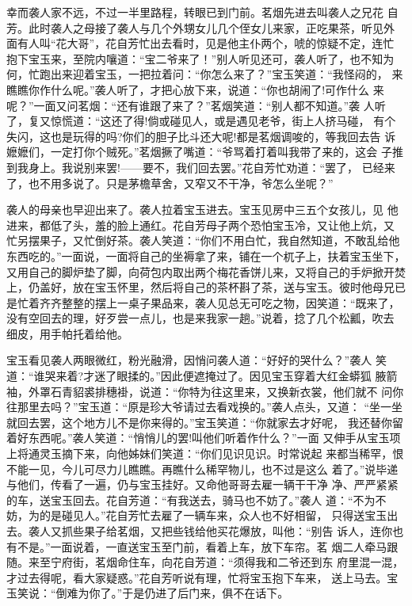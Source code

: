 幸而袭人家不远，不过一半里路程，转眼已到门前。茗烟先进去叫袭人之兄花
自芳。此时袭人之母接了袭人与几个外甥女儿几个侄女儿来家，正吃果茶，听见外
面有人叫“花大哥”，花自芳忙出去看时，见是他主仆两个，唬的惊疑不定，连忙
抱下宝玉来，至院内嚷道：“宝二爷来了！”别人听见还可，袭人听了，也不知为
何，忙跑出来迎着宝玉，一把拉着问：“你怎么来了？”宝玉笑道：“我怪闷的，
来瞧瞧你作什么呢。”袭人听了，才把心放下来，说道：“你也胡闹了!可作什么
来呢？”一面又问茗烟：“还有谁跟了来了？”茗烟笑道：“别人都不知道。”袭
人听了，复又惊慌道：“这还了得!倘或碰见人，或是遇见老爷，街上人挤马碰，
有个失闪，这也是玩得的吗?你们的胆子比斗还大呢!都是茗烟调唆的，等我回去告
诉嬷嬷们，一定打你个贼死。”茗烟撅了嘴道：“爷骂着打着叫我带了来的，这会
子推到我身上。我说别来罢!——要不，我们回去罢。”花自芳忙劝道：“罢了，
已经来了，也不用多说了。只是茅檐草舍，又窄又不干净，爷怎么坐呢？”

袭人的母亲也早迎出来了。袭人拉着宝玉进去。宝玉见房中三五个女孩儿，见
他进来，都低了头，羞的脸上通红。花自芳母子两个恐怕宝玉冷，又让他上炕，又
忙另摆果子，又忙倒好茶。袭人笑道：“你们不用白忙，我自然知道，不敢乱给他
东西吃的。”一面说，一面将自己的坐褥拿了来，铺在一个杌子上，扶着宝玉坐下，
又用自己的脚炉垫了脚，向荷包内取出两个梅花香饼儿来，又将自己的手炉掀开焚
上，仍盖好，放在宝玉怀里，然后将自己的茶杯斟了茶，送与宝玉。彼时他母兄已
是忙着齐齐整整的摆上一桌子果品来，袭人见总无可吃之物，因笑道：“既来了，
没有空回去的理，好歹尝一点儿，也是来我家一趟。”说着，捻了几个松瓤，吹去
细皮，用手帕托着给他。

宝玉看见袭人两眼微红，粉光融滑，因悄问袭人道：“好好的哭什么？”袭人
笑道：“谁哭来着?才迷了眼揉的。”因此便遮掩过了。因见宝玉穿着大红金蟒狐
腋箭袖，外罩石青貂裘排穗褂，说道：“你特为往这里来，又换新衣裳，他们就不
问你往那里去吗？”宝玉道：“原是珍大爷请过去看戏换的。”袭人点头，又道：
“坐一坐就回去罢，这个地方儿不是你来得的。”宝玉笑道：“你就家去才好呢，
我还替你留着好东西呢。”袭人笑道：“悄悄儿的罢!叫他们听着作什么？”一面
又伸手从宝玉项上将通灵玉摘下来，向他姊妹们笑道：“你们见识见识。时常说起
来都当稀罕，恨不能一见，今儿可尽力儿瞧瞧。再瞧什么稀罕物儿，也不过是这么
着了。”说毕递与他们，传看了一遍，仍与宝玉挂好。又命他哥哥去雇一辆干干净
净、严严紧紧的车，送宝玉回去。花自芳道：“有我送去，骑马也不妨了。”袭人
道：“不为不妨，为的是碰见人。”花自芳忙去雇了一辆车来，众人也不好相留，
只得送宝玉出去。袭人又抓些果子给茗烟，又把些钱给他买花爆放，叫他：“别告
诉人，连你也有不是。”一面说着，一直送宝玉至门前，看着上车，放下车帘。茗
烟二人牵马跟随。来至宁府街，茗烟命住车，向花自芳道：“须得我和二爷还到东
府里混一混，才过去得呢，看大家疑惑。”花自芳听说有理，忙将宝玉抱下车来，
送上马去。宝玉笑说：“倒难为你了。”于是仍进了后门来，俱不在话下。

